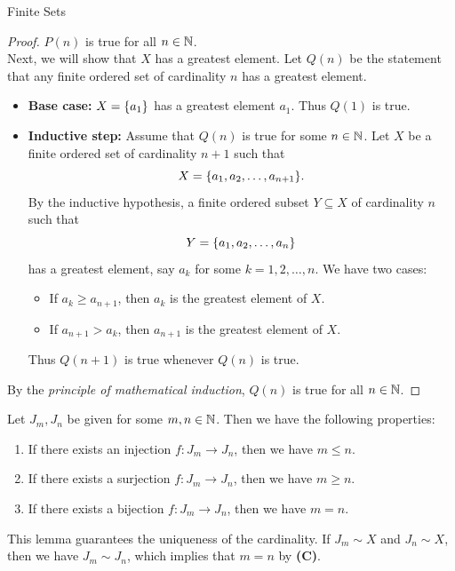 \begin{section}{Finite Sets}
\begin{proof}
    $P(n)$ is true for all $n \in \N$.
    \\[6mm]
    Next, we will show that $X$ has a greatest element. Let $Q(n)$ be the statement that
    any finite ordered set of cardinality $n$ has a greatest element.
    \begin{itemize}
        \item \textbf{Base case:} $X = \set*{a_{1}}$ has a greatest element $a_{1}$. Thus $Q(1)$ is true.
        \item \textbf{Inductive step:} Assume that $Q(n)$ is true for some $n \in \N$.
        Let $X$ be a finite ordered set of cardinality $n + 1$ such that
        \[
        X = \set*{a_{1}, a_{2}, \dots, a_{n + 1}}.
        \]
        By the inductive hypothesis, a finite ordered subset $Y \subseteq X$ of cardinality $n$ such that
        \[
        Y = \set*{a_{1}, a_{2}, \dots, a_{n}}
        \]
        has a greatest element, say $a_{k}$ for some $k = 1, 2, \dots, n$. We have two cases:
        \begin{itemize}
            \item If $a_{k} \geq a_{n + 1}$, then $a_{k}$ is the greatest element of $X$.
            \item If $a_{n + 1} > a_{k}$, then $a_{n + 1}$ is the greatest element of $X$.
        \end{itemize}
        Thus $Q(n + 1)$ is true whenever $Q(n)$ is true.
    \end{itemize}
    By the \emph{principle of mathematical induction},
    $Q(n)$ is true for all $n \in \N$.
\end{proof}

\bigskip

\begin{lemma} \label{lem:PropertiesOfJmJn}
    Let $J_{m}, J_{n}$ be given for some $m, n \in \N$. Then we have the following properties:
    \begin{enumerate}[label=\textbf{(\Alph*)}]
        \item If there exists an injection $f: J_{m} \to J_{n}$, then we have $m \leq n$.
        \item If there exists a surjection $f: J_{m} \to J_{n}$, then we have $m \geq n$.
        \item If there exists a bijection $f: J_{m} \to J_{n}$, then we have $m = n$.
    \end{enumerate}
    This lemma guarantees the uniqueness of the cardinality. If $J_{m} \hyperref[thm:BijectionEquivalenceRelation]{\sim} X$
    and $J_{n} \hyperref[thm:BijectionEquivalenceRelation]{\sim} X$, then we have
    $J_{m} \hyperref[thm:BijectionEquivalenceRelation]{\sim} J_{n}$, which implies that $m = n$ by \textbf{(C)}.
\end{lemma}


\end{section}
